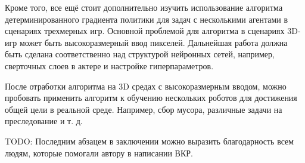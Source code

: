 Кроме того, все ещё стоит дополнительно изучить использование алгоритма детерминированного градиента политики для задач с несколькими агентами в сценариях трехмерных игр. Основной проблемой для алгоритма в сценариях 3D-игр может быть высокоразмерный ввод пикселей. Дальнейшая работа должна быть сделана соответственно над структурой нейронных сетей, например, сверточных слоев в актере и настройке гиперпараметров.

После отработки алгоритма на 3D средах с высокоразмерным вводом, можно пробовать применить алгоритм к обучению нескольких роботов для достижения общей цели в реальной среде. Например, сбор мусора, различные задачи на преследование и т. д.

TODO: Последним абзацем в заключении можно выразить благодарность всем людям, которые помогали автору в написании ВКР.